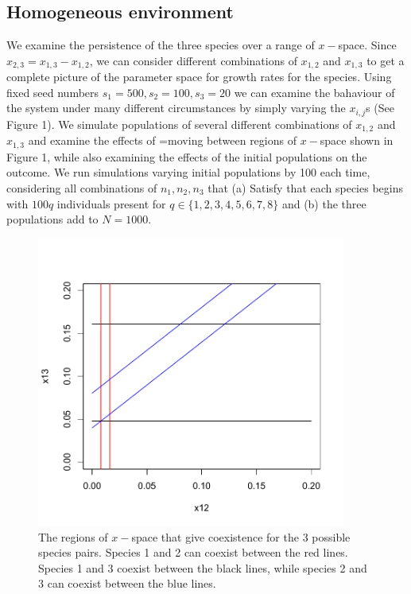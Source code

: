 \documentclass[preprint,10pt,reqno]{amsart}
\begin{document}
\subsection{Homogeneous environment}
We examine the persistence of the three species over a range of $x-$space. Since $x_{2,3}=x_{1,3}-x_{1,2}$, we can consider different combinations of 
$x_{1,2}$ and $x_{1,3}$ to get a complete picture of the parameter space for growth rates for the species. Using fixed seed numbers $s_1=500,s_2=100,s_3=20$ we can examine the bahaviour of the system under many different circumstances by simply varying the $x_{i,j}$s (See Figure 1). We simulate populations of several different combinations of $x_{1,2}$ and $x_{1,3}$ and examine the effects of =moving between regions of $x-$space shown in Figure 1, while also examining the effects of the initial populations on the outcome. We run simulations varying initial populations by 100 each time, considering all combinations of $n_1,n_2,n_3$ that (a) Satisfy that each species begins with $100q$ individuals present for $q \in \{1,2,3,4,5,6,7,8\}$ and (b) the three populations add to $N=1000$. 
\begin{figure}[htbp]
\begin{center}
\includegraphics[width=4in]{3dxchoices.pdf}
\caption{The regions of $x-$space that give coexistence for the 3 possible species pairs. Species 1 and 2 can coexist between the red lines. Species 1 and 3 coexist between the black lines, while species 2 and 3 can coexist between the blue lines.}
\label{default}
\end{center}
\end{figure}
\end{document}
